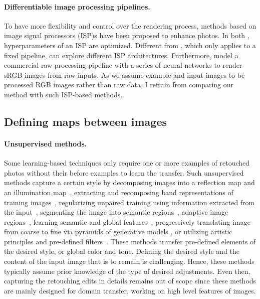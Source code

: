 \paragraph{Differentiable image processing pipelines.}
To have more flexibility and control over the rendering process, methods based on image signal processors (ISP)s have been proposed to enhance photos. In both \cite{tseng2019hyperparameter, yu2021reconfigisp}, hyperparameters of an ISP are optimized. Different from \cite{tseng2019hyperparameter}, which only applies to a fixed pipeline, \citeauthor{yu2021reconfigisp} \cite{yu2021reconfigisp} can explore different ISP architectures. Furthermore, \citeauthor{tseng2022neural} \cite{tseng2022neural} model a commercial raw processing pipeline with a series of neural networks to render sRGB images from raw inputs. As we assume example and input images to be processed RGB images rather than raw data, I refrain from comparing our method with such ISP-based methods.


\subsection{Defining maps between images}

\paragraph{Unsupervised methods.} Some learning-based techniques only require one or more examples of retouched photos without their before examples to learn the transfer. Such unsupervised methods capture a certain style by decomposing images into a reflection map and an illumination map~\cite{ma2021retinexgan},
extracting and recomposing band representations of training images~\cite{yang2020fidelity}, regularizing unpaired training using information extracted from the input~\cite{9334429}, segmenting the image into semantic regions~\cite{Liu16Makeup}, adaptive image regions~\cite{Frigo16Split}, learning semantic and global features~\cite{Chen18Deep}, progressively translating image from coarse to fine via pyramids of generative models \cite{lin2020tuigan}, or utilizing artistic principles and pre-defined filters~\cite{Zhang13Style,Hu18Exposure}. These methods transfer pre-defined elements of the desired style, or global color and tone. Defining the desired style and the content of the input image that is to remain is challenging. Hence, these methods typically assume prior knowledge of the type of desired adjustments. Even then, capturing the retouching edits in details remains out of scope since these methods are mainly designed for domain transfer, working on high level features of images. %

